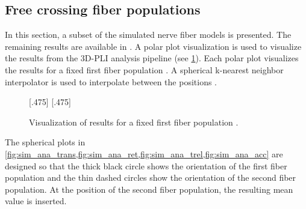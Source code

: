 \subsection{Free crossing fiber populations}
\label{sec:resFreeCross}
%
In this section, a subset of the simulated nerve fiber models is presented.
The remaining results are available in .
A polar plot visualization is used to visualize the results from the \ac{3D-PLI} analysis pipeline (see \cref{fig:simModelSphereSample}).
Each polar plot visualizes the results for a fixed first fiber population \popa{}.
A spherical k-nearest neighbor interpolator is used to interpolate between the positions \cite{DBLP:journals/corr/abs-1910-00704}.
% 
\begin{figure}[t]
\centering
\setlength{\tikzwidth}{0.40\textwidth}
[.475\textwidth]{}
\hfill
{}
[.475\textwidth]{}
\caption{Visualization of results for a fixed first fiber population \popa{}.}
\label{fig:simModelSphereSample}
\end{figure}
%
The spherical plots in \cref{fig:sim_ana_trans,fig:sim_ana_ret,fig:sim_ana_trel,fig:sim_ana_acc} are designed so that the thick black circle shows the orientation of the first fiber population and the thin dashed circles show the orientation of the second fiber population.
At the position of the second fiber population, the resulting mean value is inserted.
%
%
%
